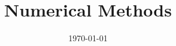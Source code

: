 \documentclass[a4paper,landscape,8pt]{extarticle}
\title{Numerical Methods}
\date{\today}
\begin{document}
\setlength{\belowdisplayskip}{4pt} \setlength{\belowdisplayshortskip}{4pt}
\setlength{\abovedisplayskip}{4pt} \setlength{\abovedisplayshortskip}{4pt}

\graphicspath{ {./img/} }

\allowdisplaybreaks

\begin{multicols*}{4}
\raggedcolumns

\maketitle

\setcounter{tocdepth}{2}






\end{multicols*}
\end{document}
